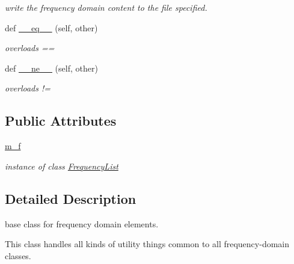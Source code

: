 \begin{DoxyCompactItemize}
\begin{DoxyCompactList}\small\item\em write the frequency domain content to the file specified. \end{DoxyCompactList}\item 
def \hyperlink{classSignalIntegrity_1_1FrequencyDomain_1_1FrequencyDomain_1_1FrequencyDomain_ad794ff077f2f05f228a7109f3670ac40}{\+\_\+\+\_\+eq\+\_\+\+\_\+} (self, other)
\begin{DoxyCompactList}\small\item\em overloads == \end{DoxyCompactList}\item 
def \hyperlink{classSignalIntegrity_1_1FrequencyDomain_1_1FrequencyDomain_1_1FrequencyDomain_aa0b54a20b36fcc55e1147de88d083072}{\+\_\+\+\_\+ne\+\_\+\+\_\+} (self, other)
\begin{DoxyCompactList}\small\item\em overloads != \end{DoxyCompactList}\end{DoxyCompactItemize}
\subsection*{Public Attributes}
\begin{DoxyCompactItemize}
\item 
\mbox{\label{classSignalIntegrity_1_1FrequencyDomain_1_1FrequencyDomain_1_1FrequencyDomain_a40a26fb5046a51e40dd1b61c78d72ace}} 
\hyperlink{classSignalIntegrity_1_1FrequencyDomain_1_1FrequencyDomain_1_1FrequencyDomain_a40a26fb5046a51e40dd1b61c78d72ace}{m\+\_\+f}
\begin{DoxyCompactList}\small\item\em instance of class \hyperlink{namespaceSignalIntegrity_1_1FrequencyDomain_1_1FrequencyList}{Frequency\+List} \end{DoxyCompactList}\end{DoxyCompactItemize}


\subsection{Detailed Description}
base class for frequency domain elements. 

This class handles all kinds of utility things common to all frequency-\/domain classes. 

